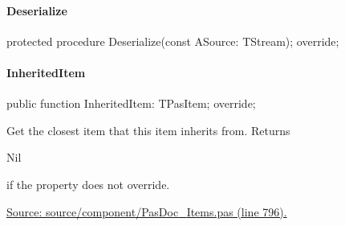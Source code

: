 \documentclass{report}
\newif\ifpdf
\begin{document}
\paragraph*{Deserialize}\hspace*{\fill}

\label{PasDoc_Items.TPasProperty-Deserialize}
\begin{list}{}{
\setlength{\itemindent}{0cm}
\setlength{\listparindent}{0cm}
\setlength{\leftmargin}{\evensidemargin}
\addtolength{\leftmargin}{\tmplength}
\settowidth{\labelsep}{X}
\addtolength{\leftmargin}{\labelsep}
\setlength{\labelwidth}{\tmplength}
}
\item[\textbf{Declaration}\hfill]
\ifpdf
\begin{flushleft}
\fi
\begin{ttfamily}
protected procedure Deserialize(const ASource: TStream); override;\end{ttfamily}

\ifpdf
\end{flushleft}
\fi

\end{list}
\paragraph*{InheritedItem}\hspace*{\fill}

\label{PasDoc_Items.TPasProperty-InheritedItem}
\begin{list}{}{
\setlength{\itemindent}{0cm}
\setlength{\listparindent}{0cm}
\setlength{\leftmargin}{\evensidemargin}
\addtolength{\leftmargin}{\tmplength}
\settowidth{\labelsep}{X}
\addtolength{\leftmargin}{\labelsep}
\setlength{\labelwidth}{\tmplength}
}
\item[\textbf{Declaration}\hfill]
\ifpdf
\begin{flushleft}
\fi
\begin{ttfamily}
public function InheritedItem: TPasItem; override;\end{ttfamily}

\ifpdf
\end{flushleft}
\fi

\par
\item[\textbf{Description}]
Get the closest item that this item inherits from. Returns \begin{ttfamily}Nil\end{ttfamily} if the property does not override.\par
\href{https://github.com/pasdoc/pasdoc/blob/master/source/component/PasDoc_Items.pas#L796}{Source: source/component/PasDoc{\_}Items.pas (line 796).}

\end{list}
\end{document}
